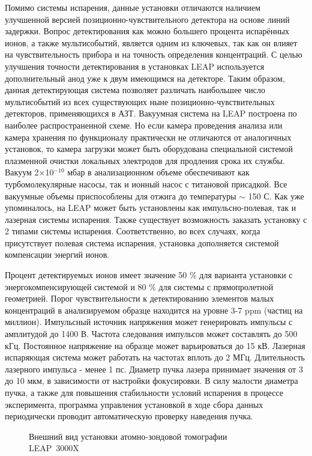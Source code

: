 Помимо системы испарения, данные установки отличаются наличием улучшенной версией позиционно-чувствительного детектора на основе линий задержки. Вопрос детектирования как можно большего процента испарённых ионов, а также мультисобытий, является одним из ключевых, так как он влияет на чувствительность прибора и на точность определения концентраций. С целью улучшения точности детектирования в установках LEAP используется дополнительный анод уже к двум имеющимся на детекторе. Таким образом, данная детектирующая система позволяет различать наибольшее число мультисобытий из всех существующих ныне позиционно-чувствительных детекторов, применяющихся в АЗТ.
Вакуумная система на LEAP построена по наиболее распространенной схеме. Но если камера проведения анализа или камера хранения по функционалу практически не отличаются от аналогичных установок, то камера загрузки может быть оборудована специальной системой плазменной очистки локальных электродов для продления срока их службы. Вакуум 2×10$^{-10}$ мбар в анализационном объеме обеспечивают как турбомолекулярные насосы, так и ионный насос с титановой присадкой. Все вакуумные объемы приспособлены для отжига до температуры $\sim$ 150 \textdegree С.
Как уже упоминалось, на LEAP может быть установлены как импульсно-полевая, так и лазерная системы испарения. Также существует возможность заказать установку с 2 типами системы испарения. Соответственно, во всех случаях, когда присутствует полевая система испарения, установка дополняется системой компенсации энергий ионов.

Процент детектируемых ионов имеет значение 50 \% для варианта установки с энергокомпенсирующей системой и 80 \% для системы с прямопролетной геометрией. Порог чувствительности к детектированию элементов малых концентраций в анализируемом образце находится на уровне 3-7 ppm (частиц на миллион). Импульсный источник напряжения может генерировать импульсы с амплитудой до 1400 В. Частота следования импульсов может составлять до 500 кГц. Постоянное напряжение на образце может варьироваться до 15 кВ. Лазерная испаряющая система может работать на частотах вплоть до 2 МГц. Длительность лазерного импульса - менее 1 пс. Диаметр пучка лазера принимает значения от 3 до 10 мкм, в зависимости от настройки фокусировки. В силу малости диаметра пучка, а также для повышения стабильности условий испарения в процессе эксперимента, программа управления установкой в ходе сбора данных периодически проводит автоматическую проверку наведения пучка.

\begin{figure}[htb]
	\caption{Внешний вид установки атомно-зондовой томографии LEAP~3000X~\cite{LEAP3000}}
	\label{fig:leap3000}
\end{figure}


